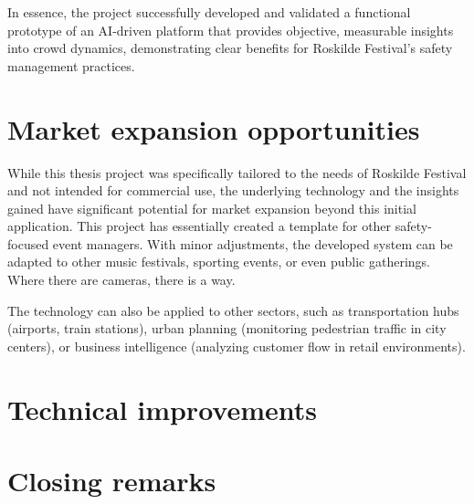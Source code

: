 In essence, the project successfully developed and validated a functional prototype of an AI-driven platform that provides objective, measurable insights into crowd dynamics, demonstrating clear benefits for Roskilde Festival's safety management practices.

\section{Market expansion opportunities}

While this thesis project was specifically tailored to the needs of Roskilde Festival and not intended for commercial use, the underlying technology and the insights gained have significant potential for market expansion beyond this initial application. This project has essentially created a template for other safety-focused event managers. With minor adjustments, the developed system can be adapted to other music festivals, sporting events, or even public gatherings. Where there are cameras, there is a way.

The technology can also be applied to other sectors, such as transportation hubs (airports, train stations), urban planning (monitoring pedestrian traffic in city centers), or business intelligence (analyzing customer flow in retail environments).

\section{Technical improvements}

\section{Closing remarks}